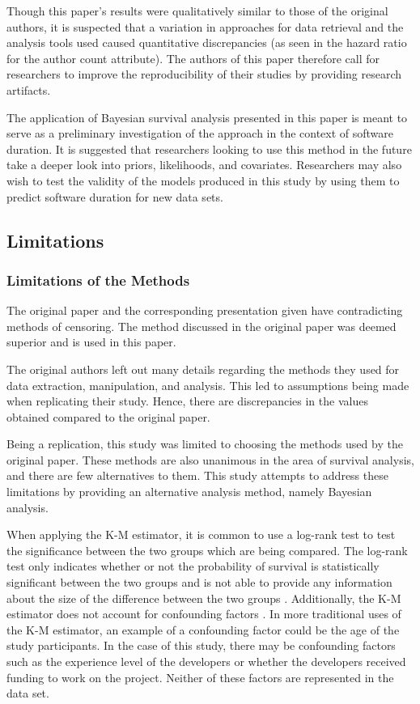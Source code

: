 \documentclass[sigconf,review]{acmart}
\begin{document}
Though this paper's results were qualitatively similar to those of the original authors, it is suspected that a variation in approaches for data retrieval and the analysis tools used caused quantitative discrepancies (as seen in the hazard ratio for the author count attribute).
The authors of this paper therefore call for researchers to improve the reproducibility of their studies by providing research artifacts.

The application of Bayesian survival analysis presented in this paper is meant to serve as a preliminary investigation of the approach in the context of software duration.
It is suggested that researchers looking to use this method in the future take a deeper look into priors, likelihoods, and covariates.
Researchers may also wish to test the validity of the models produced in this study by using them to predict software duration for new data sets.

\subsection{Limitations} \label{limit}

\subsubsection{Limitations of the Methods} \label{limit-methods}

The original paper \cite{ali2020cheating} and the corresponding presentation given \cite{ali2020video} have contradicting methods of censoring.
The method discussed in the original paper was deemed superior and is used in this paper.

The original authors left out many details regarding the methods they used for data extraction, manipulation, and analysis.
This led to assumptions being made when replicating their study.
Hence, there are discrepancies in the values obtained compared to the original paper.

Being a replication, this study was limited to choosing the methods used by the original paper.
These methods are also unanimous in the area of survival analysis, and there are few alternatives to them.
This study attempts to address these limitations by providing an alternative analysis method, namely Bayesian analysis.

When applying the K-M estimator, it is common to use a log-rank test to test the significance between the two groups which are being compared.
The log-rank test only indicates whether or not the probability of survival is statistically significant between the two groups and is not able to provide any information about the size of the difference between the two groups \cite{stel2011kaplan}.
Additionally, the K-M estimator does not account for confounding factors \cite{stel2011kaplan}.
In more traditional uses of the K-M estimator, an example of a confounding factor could be the age of the study participants.
In the case of this study, there may be confounding factors such as the experience level of the developers or whether the developers received funding to work on the project.
Neither of these factors are represented in the data set.
\end{document}

